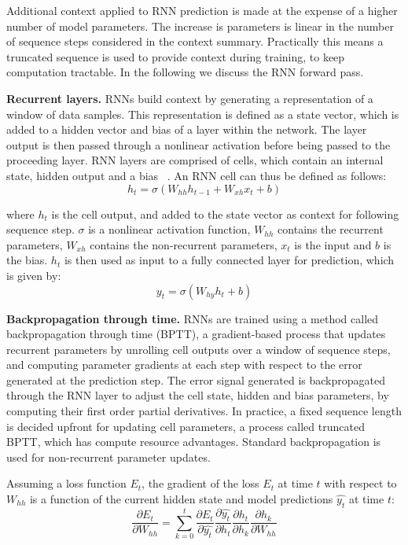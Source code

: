 \noindent Additional context applied to RNN prediction is made at the expense of a higher number of model parameters. The increase is parameters is linear in the number of sequence steps considered in the context summary. Practically this means a truncated sequence is used to provide context during training, to keep computation tractable. In the following we discuss the RNN forward pass. \par

\noindent \textbf{Recurrent layers.} RNNs build context by generating a representation of a window of data samples. This representation is defined as a state vector, which is added to a hidden vector and bias of a layer within the network. The layer output is then passed through a nonlinear activation before being passed to the proceeding layer. RNN layers are comprised of cells, which contain an internal state, hidden output and a bias \unskip ~\citep{DLIndaba2018}. An RNN cell can thus be defined as follows: 
\begin{equation}
	h_t = \sigma(W_{hh}h_{t-1} + W_{xh}x_t + b)
\end{equation}

\noindent where $h_t$ is the cell output, and added to the state vector as context for following sequence step. $\sigma$ is a nonlinear activation function, $W_{hh}$ contains the recurrent parameters, $W_{xh}$ contains the non-recurrent parameters, $x_t$ is the input and $b$ is the bias. $h_t$ is then used as input to a fully connected layer for prediction, which is given by:
\begin{equation}
	y_t = \sigma(W_{hy}h_{t} + b)
\end{equation}

\noindent \textbf{Backpropagation through time.} RNNs are trained using a method called backpropagation through time (BPTT),  a gradient-based process that updates recurrent parameters by unrolling cell outputs over a window of sequence steps, and computing parameter gradients at each step with respect to the error generated at the prediction step. The error signal generated is backpropagated through the RNN layer to adjust the cell state, hidden and bias parameters, by computing their first order partial derivatives. In practice, a fixed sequence length is decided upfront for updating cell parameters, a process called truncated BPTT, which has compute resource advantages. Standard backpropagation is used for non-recurrent parameter updates. \par

\noindent Assuming a loss function $ E_t $, the gradient of the loss $E_t$ at time $t$ with respect to $W_{hh}$ is a function of the current hidden state and model predictions $\hat{y_t}$ at time $t$:  
\begin{equation}
	\frac{\partial E_t} {\partial W_{hh}} = \sum_{k=0}^{t}\frac{\partial E_t} {\partial \hat{y_t}}\frac{\partial \hat{y_t}} {\partial h_t}\frac{\partial h_t} {\partial h_k}\frac{\partial h_k} {\partial W_{hh}}
\end{equation}

